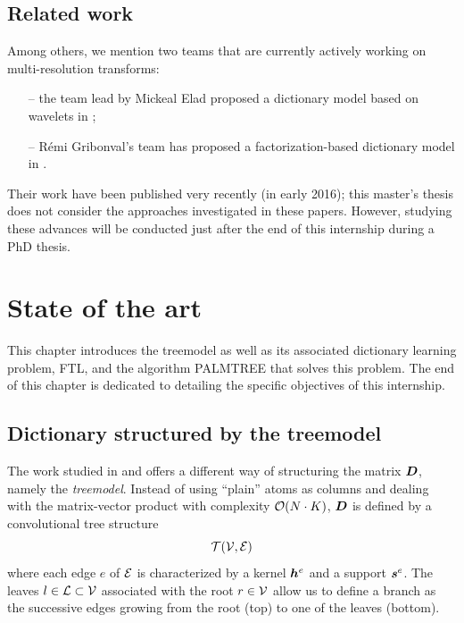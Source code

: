 \section{Related work}
Among others, we mention two teams that are currently actively working on multi-resolution transforms:
\begin{itemize}
	\item[--] the team lead by Mickeal Elad proposed a dictionary model based on wavelets in \cite{sulam_trainlets:_2016};
	\item[--] Rémi Gribonval’s team has proposed a factorization-based dictionary model in  \cite{le_magoarou_flexible_2016}.
\end{itemize}
Their work have been published very recently (in early 2016); this master's thesis does not consider the approaches investigated in these papers. However, studying these advances will be conducted just after the end of this internship during a PhD thesis.


\chapter{State of the art}
This chapter introduces the \gls{treemodel} as well as its associated dictionary learning problem, \acs{FTL}, and the algorithm \ac{PALMTREE} that solves this problem. The end of this chapter is dedicated to detailing the specific objectives of this internship.

\section{Dictionary structured by the \gls{treemodel}}\label{sec_tree_model}
The work studied in \cite{chabiron_toward_2015} and \cite{chabiron_optimization_2016} offers a different way of structuring the matrix $\bm{D}$, namely the \emph{\gls{treemodel}}. Instead of using “plain” atoms as columns and dealing with the matrix-vector product with complexity $\mathcal{O}(N \cdot K)$, $\bm{D}$ is defined by a convolutional tree structure \begin{equation*}\mathcal T(\mathcal V,\mathcal E)\end{equation*} where each edge $e$ of $\mathcal E$ is characterized by a kernel $\bm{h}^e$ and a support $\bm{s}^e$. The leaves $l \in \mathcal L \subset \mathcal V$ associated with the root $r \in \mathcal V$ allow us to define a branch as the successive edges growing from the root (top) to one of the leaves (bottom).

